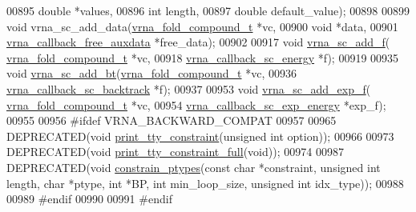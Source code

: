 \begin{DoxyCode}
00895                         \textcolor{keywordtype}{double} *values,
00896                         \textcolor{keywordtype}{int} length,
00897                         \textcolor{keywordtype}{double} default\_value);
00898 
00899 \textcolor{keywordtype}{void} vrna\_sc\_add\_data(\hyperlink{group__fold__compound_structvrna__fc__s}{vrna\_fold\_compound\_t} *vc,
00900                       \textcolor{keywordtype}{void} *data,
00901                       \hyperlink{group__fold__compound_ga75aaf7b809290de808e545877a9e20f7}{vrna\_callback\_free\_auxdata} *free\_data);
00902 
00917 \textcolor{keywordtype}{void} \hyperlink{group__generalized__sc_ga8c7d907ec0125cd61c04e0908010a4e9}{vrna\_sc\_add\_f}( \hyperlink{group__fold__compound_structvrna__fc__s}{vrna\_fold\_compound\_t} *vc,
00918                     \hyperlink{group__generalized__sc_ga2f3d2d2333e5a616e0f5cd4823780c0c}{vrna\_callback\_sc\_energy} *f);
00919 
00935 \textcolor{keywordtype}{void} \hyperlink{group__generalized__sc_gabde7d07a79bb9a8f4721aee247b674ea}{vrna\_sc\_add\_bt}(\hyperlink{group__fold__compound_structvrna__fc__s}{vrna\_fold\_compound\_t} *vc,
00936                     \hyperlink{group__generalized__sc_ga1157aec50aa078464b868b5d2245ebf5}{vrna\_callback\_sc\_backtrack} *f);
00937 
00953 \textcolor{keywordtype}{void} \hyperlink{group__generalized__sc_ga87e382b5d0c9b7d9ce1b79c0473ff700}{vrna\_sc\_add\_exp\_f}( \hyperlink{group__fold__compound_structvrna__fc__s}{vrna\_fold\_compound\_t} *vc,
00954                         \hyperlink{group__generalized__sc_ga28d5138cc47eb7a5116c87518fd076a9}{vrna\_callback\_sc\_exp\_energy} *exp\_f);
00955 
00956 \textcolor{preprocessor}{#ifdef  VRNA\_BACKWARD\_COMPAT}
00957 
00965 DEPRECATED(\textcolor{keywordtype}{void} \hyperlink{constraints_8h_a4d167deb70bb51723e44374dc981deb2}{print\_tty\_constraint}(\textcolor{keywordtype}{unsigned} \textcolor{keywordtype}{int} option));
00966 
00973 DEPRECATED(\textcolor{keywordtype}{void} \hyperlink{constraints_8h_ae8ae8a34962b9959be3f6c40f0a80ac1}{print\_tty\_constraint\_full}(\textcolor{keywordtype}{void}));
00974 
00987 DEPRECATED(\textcolor{keywordtype}{void} \hyperlink{constraints_8h_a36c3a6c3218b041f992052767bc74549}{constrain\_ptypes}(\textcolor{keyword}{const} \textcolor{keywordtype}{char} *constraint, \textcolor{keywordtype}{unsigned} \textcolor{keywordtype}{int} length, \textcolor{keywordtype}{char} *ptype, \textcolor{keywordtype}{
      int} *BP, \textcolor{keywordtype}{int} min\_loop\_size, \textcolor{keywordtype}{unsigned} \textcolor{keywordtype}{int} idx\_type));
00988 
00989 \textcolor{preprocessor}{#endif}
00990 
00991 \textcolor{preprocessor}{#endif}
\end{DoxyCode}
